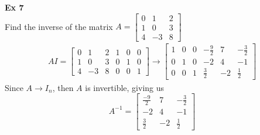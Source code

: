 \documentclass{article}
\begin{document}
  \textbf{Ex 7}\\
  Find the inverse of the matrix $ A = \begin{bmatrix}
    0 &1 &2\\
    1 &0 &3\\
    4 &-3 &8
  \end{bmatrix} $ 
  \[
    \begin{gathered}
    A I = \begin{bmatrix}
      0 &1 &2 &1 &0 &0\\
      1 &0 &3 &0 &1 &0\\
      4 &-3 &8 &0 &0 &1
    \end{bmatrix} \to
    \begin{bmatrix}
      1 &0 &0 &-\frac{9}{2} &7 &-\frac{3}{2}\\
      0 &1 &0 &-2 &4 &-1\\
      0 &0 &1 &\frac{3}{2} &-2 &\frac{1}{2}  
    \end{bmatrix}
    \end{gathered}
  \]
  Since $ A\to I_{n} $, then $ A $ is invertible, giving us
  \[
    A^{-1} = \begin{bmatrix}
      \frac{-9}{2} &7 &-\frac{3}{2} \\
      -2 &4 &-1\\
      \frac{3}{2} &-2 &\frac{1}{2} 
    \end{bmatrix} 
  \]
\end{document}
